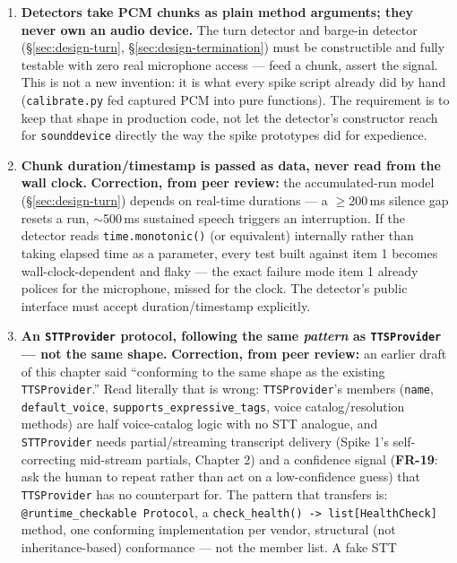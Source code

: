 \documentclass[a4paper,11pt]{report}
\newcommand{\fr}[1]{\textbf{FR-#1}}
\begin{document}
\begin{enumerate}
  \item \textbf{Detectors take PCM chunks as plain method arguments;
    they never own an audio device.} The turn detector and barge-in
    detector (\S\ref{sec:design-turn}, \S\ref{sec:design-termination})
    must be constructible and fully testable with zero real microphone
    access --- feed a chunk, assert the signal. This is not a new
    invention: it is what every spike script already did by hand
    (\texttt{calibrate.py} fed captured PCM into pure functions). The
    requirement is to keep that shape in production code, not let the
    detector's constructor reach for \texttt{sounddevice} directly the
    way the spike prototypes did for expedience.
  \item \textbf{Chunk duration/timestamp is passed as data, never read
    from the wall clock.} \textbf{Correction, from peer review:} the
    accumulated-run model (\S\ref{sec:design-turn}) depends on real-time
    durations --- a $\geq$200\,ms silence gap resets a run, ${\sim}$500\,ms
    sustained speech triggers an interruption. If the detector reads
    \texttt{time.monotonic()} (or equivalent) internally rather than
    taking elapsed time as a parameter, every test built against item 1
    becomes wall-clock-dependent and flaky --- the exact failure mode
    item 1 already polices for the microphone, missed for the clock. The
    detector's public interface must accept duration/timestamp
    explicitly.
  \item \textbf{An \texttt{STTProvider} protocol, following the same
    \emph{pattern} as \texttt{TTSProvider} --- not the same shape.}
    \textbf{Correction, from peer review:} an earlier draft of this
    chapter said ``conforming to the same shape as the existing
    \texttt{TTSProvider}.'' Read literally that is wrong:
    \texttt{TTSProvider}'s members (\texttt{name}, \texttt{default\_voice},
    \texttt{supports\_expressive\_tags}, voice catalog/resolution
    methods) are half voice-catalog logic with no STT analogue, and
    \texttt{STTProvider} needs partial/streaming transcript delivery
    (Spike 1's self-correcting mid-stream partials, Chapter 2) and a
    confidence signal (\fr{19}: ask the human to repeat rather than act
    on a low-confidence guess) that \texttt{TTSProvider} has no
    counterpart for. The pattern that transfers is: \texttt{@runtime\_checkable
    Protocol}, a \texttt{check\_health() -> list[HealthCheck]} method,
    one conforming implementation per vendor, structural (not
    inheritance-based) conformance --- not the member list. A fake STT

\end{enumerate}
\end{document}
